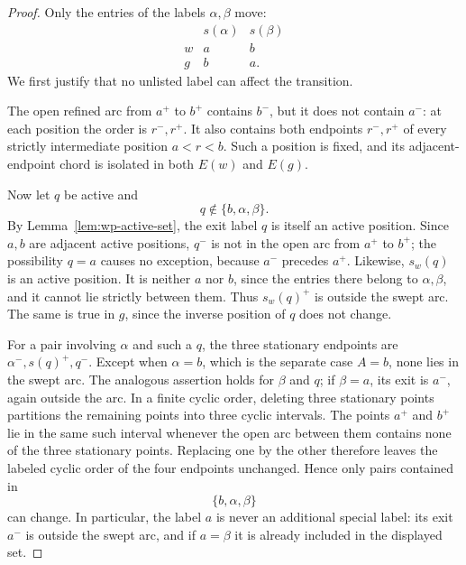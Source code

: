 \documentclass[11pt]{article}
\theoremstyle{definition}
\begin{document}
\begin{proof}
Only the entries of the labels \(\alpha,\beta\) move:
\begin{equation}
\begin{array}{c|cc}
   &s(\alpha)&s(\beta)\\ \hline
 w&a&b\\
 g&b&a.
\end{array}
\label{eq:wp-entry-swap}
\end{equation}
We first justify that no unlisted label can affect the transition.

The open refined arc from \(a^+\) to \(b^+\) contains \(b^-\), but it does not
contain \(a^-\): at each position the order is \(r^-,r^+\). It also contains
both endpoints \(r^-,r^+\) of every strictly intermediate position
\(a<r<b\). Such a position is fixed, and its adjacent-endpoint chord is
isolated in both \(E(w)\) and \(E(g)\).

Now let \(q\) be active and
\[
   q\notin\{b,\alpha,\beta\}.
\]
By Lemma~\ref{lem:wp-active-set}, the exit label \(q\) is itself an active
position. Since \(a,b\) are adjacent active positions, \(q^-\) is not in the
open arc from \(a^+\) to \(b^+\); the possibility \(q=a\) causes no exception,
because \(a^-\) precedes \(a^+\). Likewise, \(s_w(q)\) is an active position.
It is neither \(a\) nor \(b\), since the entries there belong to
\(\alpha,\beta\), and it cannot lie strictly between them. Thus
\(s_w(q)^+\) is outside the swept arc. The same is true in \(g\), since the
inverse position of \(q\) does not change.

For a pair involving \(\alpha\) and such a \(q\), the three stationary
endpoints are \(\alpha^-,s(q)^+,q^-\). Except when \(\alpha=b\), which is the
separate case \(A=b\), none lies in the swept arc. The analogous assertion
holds for \(\beta\) and \(q\); if \(\beta=a\), its exit is \(a^-\), again
outside the arc. In a finite cyclic order, deleting three stationary points
partitions the remaining points into three cyclic intervals. The points
\(a^+\) and \(b^+\) lie in the same such interval whenever the open arc
between them contains none of the three stationary points. Replacing one by
the other therefore leaves the labeled cyclic order of the four endpoints
unchanged. Hence only pairs contained in
\[
   \{b,\alpha,\beta\}
\]
can change. In particular, the label \(a\) is never an additional special
label: its exit \(a^-\) is outside the swept arc, and if \(a=\beta\) it is
already included in the displayed set.


\end{proof}
\end{document}
